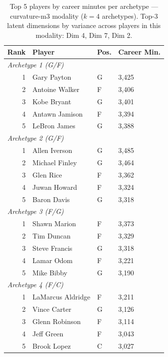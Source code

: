 \begin{table}[htbp]
  \centering\small
  \begin{tabular}{rlll}
    \toprule
    Rank & Player & Pos. & Career Min. \\
    \midrule
    \multicolumn{4}{l}{\textit{Archetype 1 (G/F)}} \\
    \midrule
    1 & Gary Payton & G & 3,425 \\
    2 & Antoine Walker & F & 3,406 \\
    3 & Kobe Bryant & G & 3,401 \\
    4 & Antawn Jamison & F & 3,394 \\
    5 & LeBron James & G & 3,388 \\
    \midrule[0.4pt]
    \multicolumn{4}{l}{\textit{Archetype 2 (G/F)}} \\
    \midrule
    1 & Allen Iverson & G & 3,485 \\
    2 & Michael Finley & G & 3,464 \\
    3 & Glen Rice & F & 3,362 \\
    4 & Juwan Howard & F & 3,324 \\
    5 & Baron Davis & G & 3,318 \\
    \midrule[0.4pt]
    \multicolumn{4}{l}{\textit{Archetype 3 (F/G)}} \\
    \midrule
    1 & Shawn Marion & F & 3,373 \\
    2 & Tim Duncan & F & 3,329 \\
    3 & Steve Francis & G & 3,318 \\
    4 & Lamar Odom & F & 3,221 \\
    5 & Mike Bibby & G & 3,190 \\
    \midrule[0.4pt]
    \multicolumn{4}{l}{\textit{Archetype 4 (F/C)}} \\
    \midrule
    1 & LaMarcus Aldridge & F & 3,211 \\
    2 & Vince Carter & G & 3,126 \\
    3 & Glenn Robinson & F & 3,114 \\
    4 & Jeff Green & F & 3,043 \\
    5 & Brook Lopez & C & 3,027 \\
    \bottomrule
  \end{tabular}
  \caption{Top 5 players by career minutes per archetype --- curvature-m3 modality ($k=4$ archetypes). Top-3 latent dimensions by variance across players in this modality: Dim 4, Dim 7, Dim 2.}
  \label{tab:arch_reps_curvature_m3}
\end{table}

